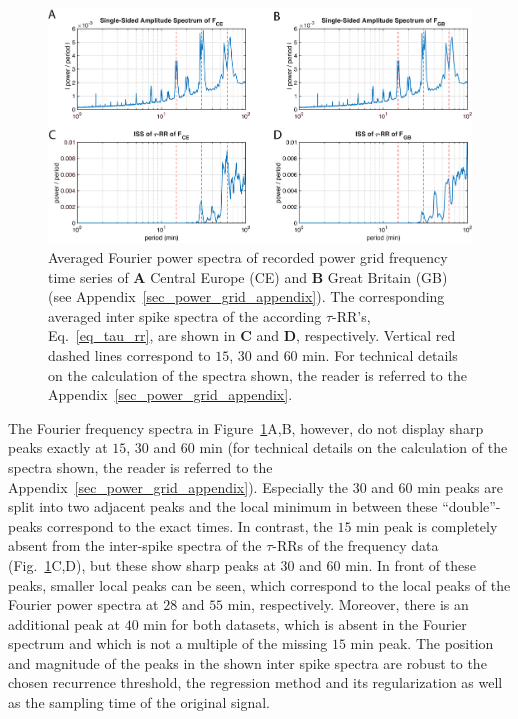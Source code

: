 \documentclass[entropy,article,submit,pdftex,moreauthors]{Definitions/mdpi}
\begin{document}
\begin{figure}
 \centering
 \includegraphics[width=\textwidth]{./figures/fig_power_grid_spectra}
 \caption{Averaged Fourier power spectra of recorded power grid frequency time series of \textbf{A} Central Europe (CE) and \textbf{B} Great Britain (GB) (see Appendix~\ref{sec_power_grid_appendix}). 
 The corresponding averaged inter spike spectra of the according $\tau$-RR's, Eq.~\eqref{eq_tau_rr}, are shown in \textbf{C} and \textbf{D}, respectively. Vertical red dashed lines correspond to 
 $15$, $30$ and $60$ \si{min}. For technical details on the calculation of the spectra shown, the reader is referred to the Appendix~\ref{sec_power_grid_appendix}.}  
\label{fig_power_grid_spectra}
\end{figure}

The Fourier frequency spectra in Figure~\ref{fig_power_grid_spectra}A,B, however, do not display sharp peaks exactly at $15$, $30$ and $60$ \si{min} (for technical details on the calculation of 
the spectra shown, the reader is referred to the Appendix~\ref{sec_power_grid_appendix}). Especially the $30$ and $60$ \si{min} 
peaks are split into two adjacent peaks and the local minimum in between these ``double''-peaks correspond to the exact times. 
In contrast, the $15$ \si{min} peak is completely absent from the inter-spike spectra of the $\tau$-RRs of the frequency data (Fig.~\ref{fig_power_grid_spectra}C,D), but these show sharp peaks 
at $30$ and $60$ \si{min}. In front of these peaks, smaller local peaks can be seen, which correspond to the local peaks of the Fourier power spectra at $28$ and $55$ \si{min}, respectively.
Moreover, there is an additional peak at 
$40$ \si{min} for both datasets, which is absent in the Fourier spectrum and which is not a multiple of the missing $15$ \si{min} peak. The position and magnitude of the peaks in the shown 
inter spike spectra are robust to the chosen recurrence threshold, the regression method and its regularization as well as the sampling time of the original signal.\\ 
\end{document}
